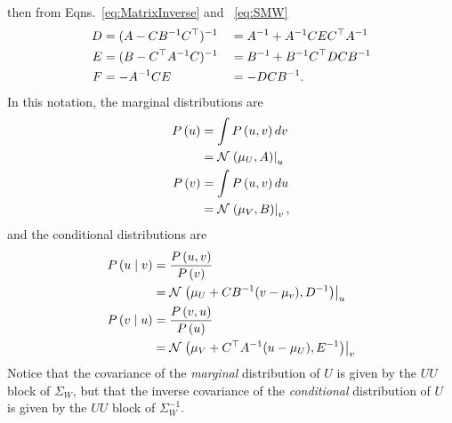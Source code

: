 then from Eqns.~\eqref{eq:MatrixInverse} and ~\eqref{eq:SMW}
\begin{subequations}
  \label{eq:MI:ABCDEF}
  \begin{align}
    \label{eq:MI:D}
    D &= (A - CB^{-1}C^\top)^{-1} & &= A^{-1} + A^{-1}C E
    C^\top A^{-1}\\
    \label{eq:MI:E}
    E &= (B - C^\top A^{-1}C)^{-1} & &= B^{-1} + B^{-1}C^\top
    D C B^{-1} \\
    \label{eq:MI:F}
    F &= -A^{-1}C E & &= -DCB^{-1}.
  \end{align}
\end{subequations}
In this notation, the marginal distributions are
\begin{subequations}
  \label{eq:Gauss-Marginal}
  \begin{align}
    P\left(u \right) &= \int P\left(u,v \right) dv \\
    &= {\mathcal{N}}\left.\left(\mu_U,A\right)\right|_{u} \\
    P\left(v \right) &= \int P\left(u,v \right) du \\
    &= {\mathcal{N}}\left.\left(\mu_V,B\right)\right|_{v},
  \end{align}
\end{subequations}
and the conditional distributions are
\begin{subequations}
  \label{eq:Gauss-Conditional}
  \begin{align}
    P\left(u \mid v \right) &= \frac{ P\left(u,v \right)}{P\left(v \right)} \\
    &= {\mathcal{N}}\left.\left(\mu_U + CB^{-1}(v-\mu_v),D^{-1}\right)\right|_{u} \\
    P\left(v \mid u \right) &= \frac{ P\left(v,u \right)}{P\left(u \right)} \\
    &= {\mathcal{N}}\left.\left(\mu_V + C^\top A^{-1} (u - \mu_U),E^{-1}\right)\right|_{v}
  \end{align}
\end{subequations}
Notice that the covariance of the \emph{marginal} distribution of $U$
is given by the $UU$ block of $\Sigma_W$, but that the inverse
covariance of the \emph{conditional} distribution of $U$ is given by
the $UU$ block of $\Sigma_W^{-1}$.

